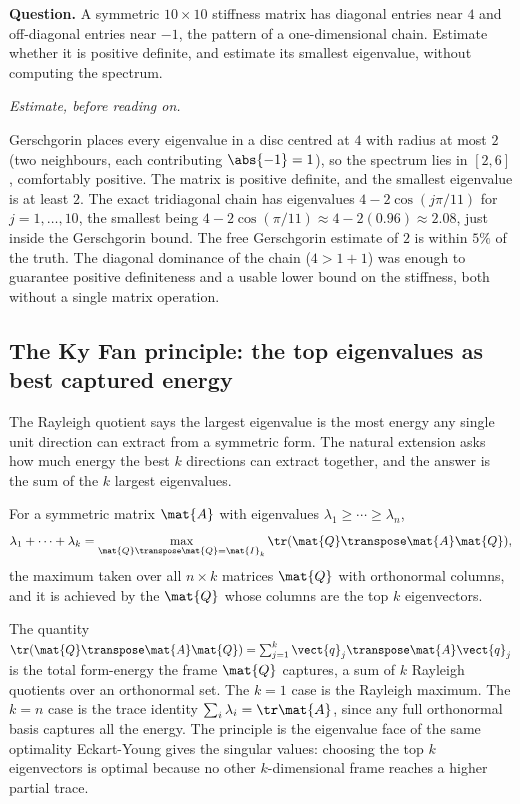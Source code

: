 \begin{estimation}
\textbf{Question.} A symmetric $10 \times 10$ stiffness matrix has
diagonal entries near $4$ and off-diagonal entries near $-1$, the
pattern of a one-dimensional chain. Estimate whether it is positive
definite, and estimate its smallest eigenvalue, without computing
the spectrum.

\smallskip
\textit{Estimate, before reading on.}

\smallskip
Gerschgorin places every eigenvalue in a disc centred at $4$ with
radius at most $2$ (two neighbours, each contributing $\abs{-1} =
1$), so the spectrum lies in $[2, 6]$, comfortably positive. The
matrix is positive definite, and the smallest eigenvalue is at least
$2$. The exact tridiagonal chain has eigenvalues $4 - 2\cos(j\pi/11)$
for $j = 1, \ldots, 10$, the smallest being $4 - 2\cos(\pi/11)
\approx 4 - 2(0.96) \approx 2.08$, just inside the Gerschgorin bound.
The free Gerschgorin estimate of $2$ is within $5\%$ of the truth.
The diagonal dominance of the chain ($4 > 1 + 1$) was enough to
guarantee positive definiteness and a usable lower bound on the
stiffness, both without a single matrix operation.
\end{estimation}

\subsection{The Ky Fan principle: the top eigenvalues as best captured energy}

The Rayleigh quotient says the largest eigenvalue is the most energy any
single unit direction can extract from a symmetric form. The natural
extension asks how much energy the best $k$ directions can extract
together, and the answer is the sum of the $k$ largest eigenvalues.

\begin{principle}
For a symmetric matrix $\mat{A}$ with eigenvalues $\lambda_{1} \geq
\cdots \geq \lambda_{n}$,
\[
\lambda_{1} + \cdots + \lambda_{k} = \max_{\mat{Q}\transpose\mat{Q}
= \mat{I}_{k}} \tr(\mat{Q}\transpose\mat{A}\mat{Q}),
\]
the maximum taken over all $n \times k$ matrices $\mat{Q}$ with
orthonormal columns, and it is achieved by the $\mat{Q}$ whose columns
are the top $k$ eigenvectors.
\end{principle}

The quantity $\tr(\mat{Q}\transpose\mat{A}\mat{Q}) = \sum_{j=1}^{k}
\vect{q}_{j}\transpose\mat{A}\vect{q}_{j}$ is the total form-energy the
frame $\mat{Q}$ captures, a sum of $k$ Rayleigh quotients over an
orthonormal set. The $k = 1$ case is the Rayleigh maximum. The $k = n$
case is the trace identity $\sum_{i}\lambda_{i} = \tr\mat{A}$, since any
full orthonormal basis captures all the energy. The principle is the
eigenvalue face of the same optimality Eckart-Young gives the singular
values: choosing the top $k$ eigenvectors is optimal because no other
$k$-dimensional frame reaches a higher partial trace.

